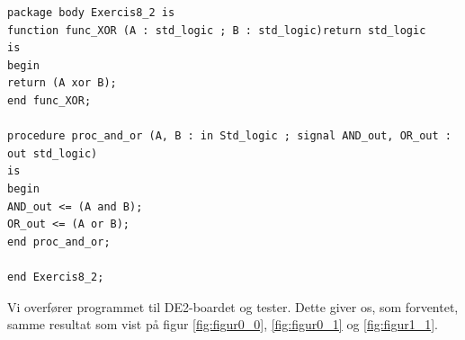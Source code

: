 \begin{enumerate}
\begin{lstlisting}[caption={Kode for test af package},label={lst:opg1_2test}]
package body Exercis8_2 is
function func_XOR (A : std_logic ; B : std_logic)return std_logic 
is
begin 
return (A xor B);
end func_XOR;

procedure proc_and_or (A, B : in Std_logic ; signal AND_out, OR_out : out std_logic) 
is
begin 
AND_out <= (A and B);
OR_out <= (A or B);
end proc_and_or;

end Exercis8_2;
\end{lstlisting}

Vi overfører programmet til DE2-boardet og tester. Dette giver os, som forventet, samme resultat som vist på figur \ref{fig:figur0_0}, \ref{fig:figur0_1} og \ref{fig:figur1_1}.

\end{enumerate}